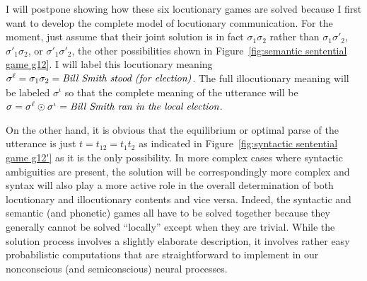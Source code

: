 I will postpone showing how these six locutionary games are solved because I first want to develop the complete model of locutionary communication. For the moment, just assume that their joint solution is in fact $\sigma_1\sigma_2$ rather than $\sigma_1\sigma'_2$, $\sigma'_1\sigma_2$, or $\sigma'_1\sigma'_2$, the other possibilities shown in Figure~\ref{fig:semantic sentential game g12}. I will label this locutionary meaning $\sigma^{\ell} = \sigma_1\sigma_2 = \emph{Bill Smith stood (for election)}$. The full illocutionary meaning will be labeled $\sigma^{\iota}$ so that the complete meaning of the utterance will be $\sigma = \sigma^{\ell} \odot \sigma^{\iota} = \emph{Bill Smith ran in the local election}$.

On the other hand, it is obvious that the equilibrium or optimal parse of the utterance is just $t = t_{12} = t_1t_2$ as indicated in Figure~\ref{fig:syntactic sentential game g12'} as it is the only possibility. In more complex cases where syntactic ambiguities are present, the solution will be correspondingly more complex and syntax will also play a more active role in the overall determination of both locutionary and illocutionary contents and vice versa. Indeed, the syntactic and semantic (and phonetic) games all have to be solved together because they generally cannot be solved ``locally'' except when they are trivial. While the solution process involves a slightly elaborate description, it involves rather easy probabilistic computations that are straightforward to implement in our nonconscious (and semiconscious) neural processes.

